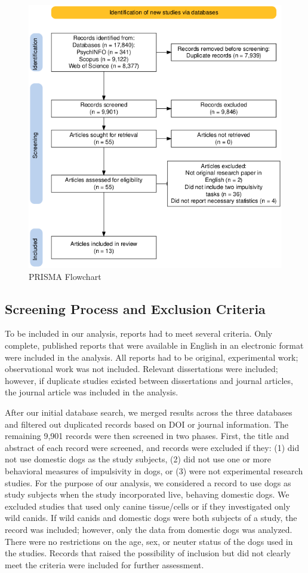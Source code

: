 \documentclass[
  ,pub,floatsintext]{apa6}
\begin{document}
\begin{figure}
\caption{\newline PRISMA Flowchart \label{fig:prisma}}
\begin{center}
\includegraphics[width=0.6\linewidth]{"figures/prisma_chart.png"}
\end{center}


\end{figure}

\hypertarget{screening-process-and-exclusion-criteria}{%
\subsection{Screening Process and Exclusion Criteria}\label{screening-process-and-exclusion-criteria}}

To be included in our analysis, reports had to meet several criteria. Only complete, published reports that were available in English in an electronic format were included in the analysis. All reports had to be original, experimental work; observational work was not included. Relevant dissertations were included; however, if duplicate studies existed between dissertations and journal articles, the journal article was included in the analysis.

After our initial database search, we merged results across the three databases and filtered out duplicated records based on DOI or journal information. The remaining 9,901 records were then screened in two phases. First, the title and abstract of each record were screened, and records were excluded if they: (1) did not use domestic dogs as the study subjects, (2) did not use one or more behavioral measures of impulsivity in dogs, or (3) were not experimental research studies. For the purpose of our analysis, we considered a record to use dogs as study subjects when the study incorporated live, behaving domestic dogs. We excluded studies that used only canine tissue/cells or if they investigated only wild canids. If wild canids and domestic dogs were both subjects of a study, the record was included; however, only the data from domestic dogs was analyzed. There were no restrictions on the age, sex, or neuter status of the dogs used in the studies. Records that raised the possibility of inclusion but did not clearly meet the criteria were included for further assessment.
\end{document}
